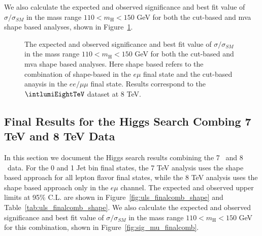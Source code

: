 We also calculate the expected and observed significance and best 
fit value of $\sigma/\sigma_{SM}$ in the mass 
range $110<\ensuremath{m_{\mathrm{H}}}<150$ GeV for both the 
cut-based and mva shape based analyses, shown in Figure~\ref{fig:sig_mu_8tev}.

\begin{figure}[!hbtp]
\centering
{}
\centering
{}
\label{fig:sig_mu_8tev}
\caption{\fixme 
The expected and observed significance and best 
fit value of $\sigma/\sigma_{SM}$ in the mass 
range $110<\ensuremath{m_{\mathrm{H}}}<150$ GeV for both the 
cut-based and mva shape based analyses. Here shape based refers to the combination of 
shape-based in the $e\mu$ final state and the cut-based anaysis in the $ee/\mu\mu$ final state.
Results correspond to the $\intlumiEightTeV$ dataset at 8 TeV. 
}
\end{figure}

\clearpage 


\subsection{Final Results for the Higgs Search Combing 7 TeV and 8 TeV Data}
\label{sec:search_results_finalcomb}

In this section we document the Higgs search results combining the 7 \TeV\ and 8 \TeV\ data.  
For the 0 and 1 Jet bin final states, the 7 TeV analysis uses the shape based approach for all 
lepton flavor final states, while the 8 TeV analysis uses the shape based approach only 
in the $e\mu$ channel. 
The expected and observed upper limits at 95\% C.L. are shown in Figure~\ref{fig:uls_finalcomb_shape} 
and Table~\ref{tab:uls_finalcomb_shape}.  We also calculate the expected and observed significance and best 
fit value of $\sigma/\sigma_{SM}$ in the mass 
range $110<\ensuremath{m_{\mathrm{H}}}<150$ GeV for this combination, shown in 
Figure~\ref{fig:sig_mu_finalcomb}.


